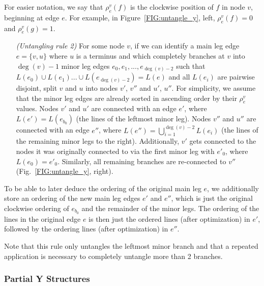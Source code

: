 \documentclass[format=acmsmall, review=false, screen=true]{acmart}
\begin{document}
For easier notation, we say that $\rho^v_e(f)$ is the clockwise position of $f$ in node $v$, beginning at edge $e$. For example, in Figure~\ref{FIG:untangle_y}, left, $\rho^v_e(f) = 0$ and $\rho^v_e(g) = 1$.
\begin{enumerate}[parsep=0.5mm, wide, labelwidth=0mm, itemindent=2.3mm]
  \setlength\itemsep{1pt}
  \item[\emph{(Untangling rule 2)}] For some node $v$, if we can identify a main leg edge $e = \{v, u\}$ where $u$ is a terminus and which completely branches at $v$ into $\deg(v) - 1$ minor leg edges $e_{0}, e_{1}, ..., e_{\deg(v) - 2}$ such that $L(e_{0}) \cup L(e_{1}) ... \cup L(e_{\deg(v) - 2}) = L(e)$ and all $L(e_{i})$ are pairwise disjoint, split $v$ and $u$ into nodes $v'$, $v''$ and $u'$, $u''$. For simplicity, we assume that the minor leg edges are already sorted in ascending order by their $\rho^v_{e}$ values. Nodes $v'$ and $u'$ are connected with an edge $e'$, where $L(e') = L(e_{b_0})$ (the lines of the leftmost minor leg). Nodes $v''$ and $u''$ are connected with an edge $e''$, where $L(e'') = \bigcup^{\deg(v) - 2}_{i = 1} L(e_{i})$ (the lines of the remaining minor legs to the right). Additionally, $v'$ gets connected to the nodes it was originally connected to via the first minor leg with $e'_{0}$, where $L(e_{0}) = e'_{0}$. Similarly, all remaining branches are re-connected to $v''$ (Fig.~\ref{FIG:untangle_y}, right).
\end{enumerate}

To be able to later deduce the ordering of the original main leg $e$, we additionally store an ordering of the new main leg edges $e'$ and $e''$, which is just the original clockwise ordering of $e_{b_0}$ and the remainder of the minor legs. The ordering of the lines in the original edge $e$ is then just the ordered lines (after optimization) in $e'$, followed by the ordering lines (after optimization) in $e''$.

Note that this rule only untangles the leftmost minor branch and that a repeated application is necessary to completely untangle more than 2 branches.

\subsubsection{Partial Y Structures}\label{SEC:ypartial}
\end{document}
